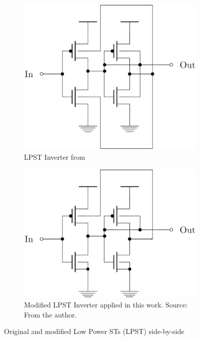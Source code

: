 \documentclass[pgmicro,mestrado,english]{iiufrgs}
\begin{document}
\begin{figure}[]
\centering
\begin{subfigure}{.5\textwidth}
  \centering
  \includegraphics[width=.8\linewidth]{STOriginal.eps}
  \caption{LPST Inverter from \citet{dokania2015circuit}}
  \label{fig:sub1}
\end{subfigure}%
\begin{subfigure}{.5\textwidth}
  \centering
  \includegraphics[width=.8\linewidth]{STcorrigido.eps}
  \caption{Modified LPST Inverter applied in this work. Source: From the author.}
  \label{fig:sub2}
\end{subfigure}
\caption{Original and modified Low Power STs (LPST) side-by-side}
\label{fig:test}
\end{figure}
\end{document}

